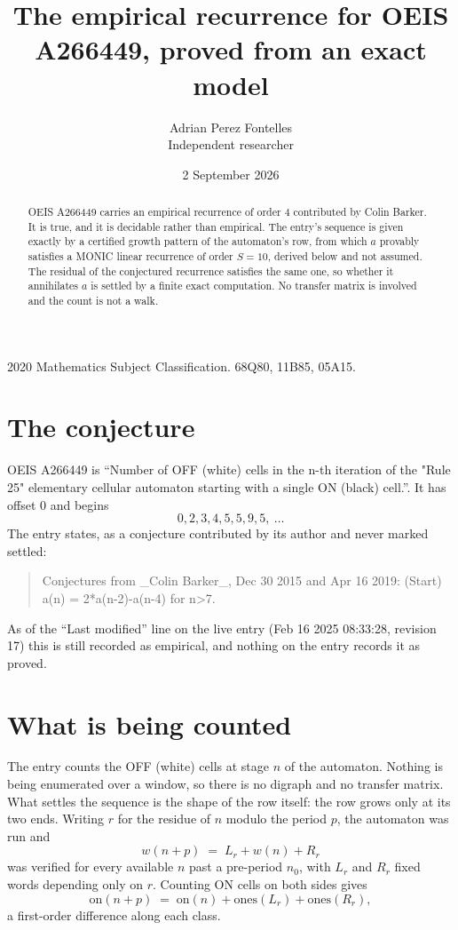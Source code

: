 \documentclass[11pt,a4paper]{article}
\title{The empirical recurrence for OEIS A266449, proved from an exact model}
\author{Adrian Perez Fontelles\\ \small Independent researcher}
\date{2 September 2026}
\theoremstyle{plain}
\theoremstyle{definition}
\begin{document}
\maketitle

\begin{abstract}
OEIS A266449 carries an empirical recurrence of order $4$ contributed by Colin Barker. It is true, and it is
decidable rather than empirical. The entry's sequence is given exactly by a certified growth pattern of the automaton's row, from
which $a$ provably satisfies a MONIC linear recurrence of order $S=10$, derived below and not
assumed. The residual of the conjectured recurrence satisfies the same one, so whether it
annihilates $a$ is settled by a finite exact computation. No transfer matrix is involved and
the count is not a walk.
\end{abstract}

\noindent\small 2020 Mathematics Subject Classification. 68Q80, 11B85, 05A15.\normalsize

\section{The conjecture}

OEIS A266449 is ``Number of OFF (white) cells in the n-th iteration of the "Rule 25" elementary cellular automaton starting with a single ON (black) cell.''. It has offset $0$ and begins
\[
0, 2, 3, 4, 5, 5, 9, 5,\ \dots
\]
The entry states, as a conjecture contributed by its author and never marked settled:
\begin{quote}
Conjectures from \_Colin Barker\_, Dec 30 2015 and Apr 16 2019: (Start) a(n) = 2*a(n-2)-a(n-4) for n>7.
\end{quote}
As of the ``Last modified'' line on the live entry (Feb 16 2025 08:33:28, revision 17)
this is still recorded as empirical, and nothing on the entry records it as proved.

\section{What is being counted}

The entry counts the OFF (white) cells at stage $n$ of the automaton. Nothing is being enumerated over a window, so there is
no digraph and no transfer matrix. What settles the sequence is the shape of the row itself:
the row grows only at its two ends. Writing
$r$ for the residue of $n$ modulo the period $p$, the automaton was run and
\[
w(n+p)\;=\;L_r + w(n) + R_r
\]
was verified for every available $n$ past a
pre-period $n_0$, with $L_r$ and $R_r$ fixed words depending only on $r$. Counting ON cells on
both sides gives
\[
\mathrm{on}(n+p)\;=\;\mathrm{on}(n)+\mathrm{ones}(L_r)+\mathrm{ones}(R_r),
\]
a first-order difference along each class.
\end{document}
